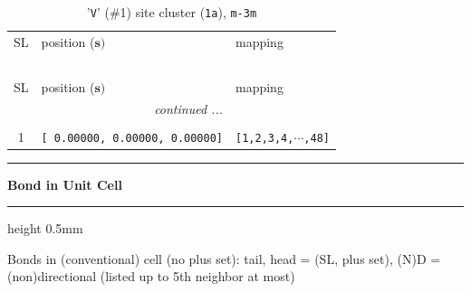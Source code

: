 \documentclass[fleqn,10pt,landscape]{jsarticle}
\begin{document}
\renewcommand{\arraystretch}{1.6}
\begin{longtable}[l]{cll}
\captionsetup{justification=raggedright, singlelinecheck=off}
\caption{'\texttt{V}' (\#1) site cluster (\texttt{1a}), \texttt{m-3m}}
 \\
 \hline \hline
SL & position ($\bm{s})$ & mapping \\ \hline \endfirsthead

\multicolumn{2}{l}{\tablename\ \thetable{}} \\
 \hline \hline
SL & position ($\bm{s})$ & mapping \\ \hline \endhead

 \hline \hline
\multicolumn{2}{r}{\footnotesize\it continued ...} \\ \endfoot

 \hline \hline
\multicolumn{2}{r}{} \\ \endlastfoot

1 & \texttt{[ 0.00000, 0.00000, 0.00000]} & \texttt{[1,2,3,4,$\cdots$,48]} \\
\end{longtable}
\vspace{5mm}
\noindent \rule[0.5mm]{5mm}{0.5mm}\hspace{3mm}\textbf{Bond in Unit Cell}\hspace{3mm}\leaders\hrule height 0.5mm\hfill\kern0pt
\vspace{3mm}

\noindent Bonds in (conventional) cell (no plus set): tail, head = (SL, plus set), (N)D = (non)directional (listed up to 5th neighbor at most)
\end{document}
